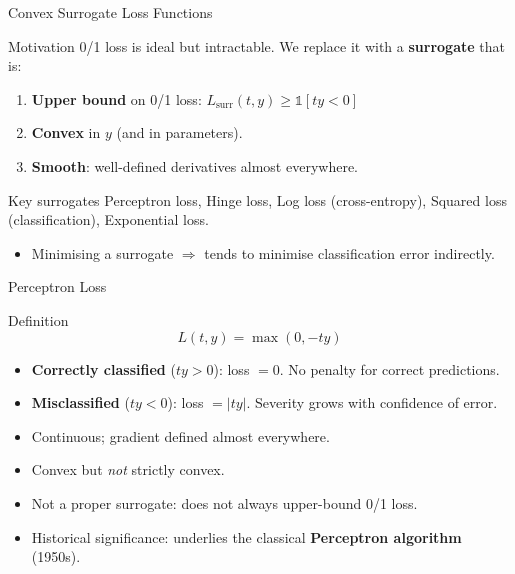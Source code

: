\begin{frame}{Convex Surrogate Loss Functions}
  \begin{block}{Motivation}
    0/1 loss is ideal but intractable. We replace it with a \textbf{surrogate} that is:
    \begin{enumerate}
      \item \textbf{Upper bound} on 0/1 loss: $L_{\mathrm{surr}}(t,y)\geq\mathbb{1}[ty<0]$
      \item \textbf{Convex} in $y$ (and in parameters).
      \item \textbf{Smooth}: well-defined derivatives almost everywhere.
    \end{enumerate}
  \end{block}
  \begin{block}{Key surrogates}
    Perceptron loss, Hinge loss, Log loss (cross-entropy), Squared loss (classification), Exponential loss.
  \end{block}
  \begin{itemize}
    \item Minimising a surrogate $\Rightarrow$ tends to minimise classification error indirectly.
  \end{itemize}
\end{frame}

\begin{frame}{Perceptron Loss}
  \begin{block}{Definition}
    \[ L(t,y) = \max(0,-ty) \]
  \end{block}
  \begin{itemize}
    \item \textbf{Correctly classified} ($ty>0$): loss $=0$. No penalty for correct predictions.
    \item \textbf{Misclassified} ($ty<0$): loss $=|ty|$. Severity grows with confidence of error.
    \item Continuous; gradient defined almost everywhere.
    \item Convex but \emph{not} strictly convex.
    \item \textcolor{AlertRed}{Not a proper surrogate}: does not always upper-bound 0/1 loss.
    \item Historical significance: underlies the classical \textbf{Perceptron algorithm} (1950s).
  \end{itemize}
\end{frame}

